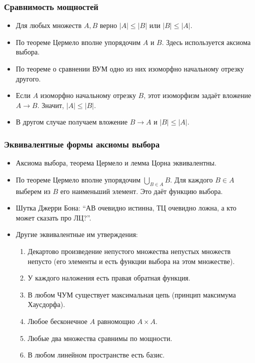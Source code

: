 \documentclass[10pt]{beamer}
\begin{document}
\begin{frame}
    \frametitle{Сравнимость мощностей}
    \begin{itemize}
        \item Для любых множеств $A,B$ верно $|A|\leq|B|$ или $|B|\leq|A|$.
        \item<2-> По теореме Цермело вполне упорядочим $A$ и $B$. Здесь используется аксиома выбора.
        \item<3-> По теореме о сравнении ВУМ одно из них изоморфно начальному отрезку другого.
        \item<4-> Если $A$ изоморфно начальному отрезку $B$, этот изоморфизм задаёт вложение $A\to B$. Значит, $|A|\leq|B|$.
        \item<5-> В другом случае получаем вложение $B\to A$ и $|B|\leq|A|$.
    \end{itemize}
\end{frame}

\begin{frame}
    \frametitle{Эквивалентные формы аксиомы выбора}
    \begin{itemize}
        \item Аксиома выбора, теорема Цермело и лемма Цорна эквивалентны.
        \item По теореме Цермело вполне упорядочим $\bigcup_{B\in A}B$. Для каждого $B\in A$ выберем из $B$ \pause его наименьший элемент. Это даёт функцию выбора.
        \item Шутка Джерри Бона: \enquote{АВ очевидно истинна, ТЦ очевидно ложна, а кто может сказать про ЛЦ?}.
        \pause
        \item Другие эквивалентные им утверждения:
        \begin{enumerate}
            \item Декартово произведение непустого множества непустых множеств непусто (его элементы и есть функции выбора на этом множестве).
            \item У каждого наложения есть правая обратная функция.
            \item В любом ЧУМ существует максимальная цепь (принцип максимума Хаусдорфа).
            \item Любое бесконечное $A$ равномощно $A \times A$.
            \item Любые два множества сравнимы по мощности.
            \item В любом линейном пространстве есть базис.
        \end{enumerate}
    \end{itemize}
\end{frame}
\end{document}
